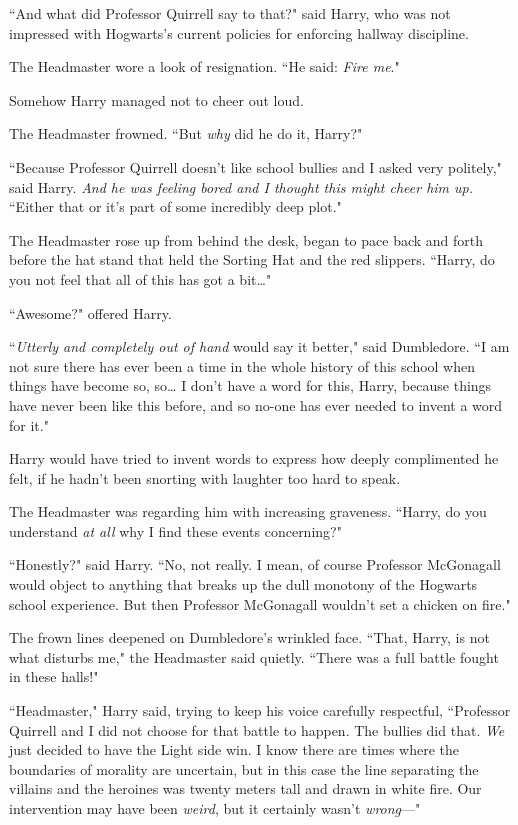 ``And what did Professor Quirrell say to that?" said Harry, who was not impressed with Hogwarts's current policies for enforcing hallway discipline.

The Headmaster wore a look of resignation. ``He said: \emph{Fire me}."

Somehow Harry managed not to cheer out loud.

The Headmaster frowned. ``But \emph{why} did he do it, Harry?"

``Because Professor Quirrell doesn't like school bullies and I asked very politely," said Harry. \emph{And he was feeling bored and I thought this might cheer him up.} ``Either that or it's part of some incredibly deep plot."

The Headmaster rose up from behind the desk, began to pace back and forth before the hat stand that held the Sorting Hat and the red slippers. ``Harry, do you not feel that all of this has got a bit{\ldots}"

``Awesome?" offered Harry.

``\emph{Utterly and completely out of hand} would say it better," said Dumbledore. ``I am not sure there has ever been a time in the whole history of this school when things have become so, so{\ldots} I don't have a word for this, Harry, because things have never been like this before, and so no-one has ever needed to invent a word for it."

Harry would have tried to invent words to express how deeply complimented he felt, if he hadn't been snorting with laughter too hard to speak.

The Headmaster was regarding him with increasing graveness. ``Harry, do you understand \emph{at all} why I find these events concerning?"

``Honestly?" said Harry. ``No, not really. I mean, of course Professor McGonagall would object to anything that breaks up the dull monotony of the Hogwarts school experience. But then Professor McGonagall wouldn't set a chicken on fire."

The frown lines deepened on Dumbledore's wrinkled face. ``That, Harry, is not what disturbs me," the Headmaster said quietly. ``There was a full battle fought in these halls!"

``Headmaster," Harry said, trying to keep his voice carefully respectful, ``Professor Quirrell and I did not choose for that battle to happen. The bullies did that. \emph{We} just decided to have the Light side win. I know there are times where the boundaries of morality are uncertain, but in this case the line separating the villains and the heroines was twenty meters tall and drawn in white fire. Our intervention may have been \emph{weird}, but it certainly wasn't \emph{wrong}—"

